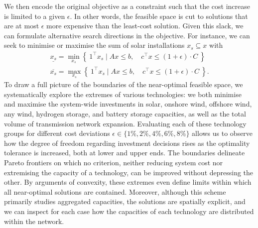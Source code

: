 We then encode the original objective as a constraint such that the cost
increase is limited to a given $\epsilon$. In other words, the feasible space is
cut to solutions that are at most $\epsilon$ more expensive than the least-cost
solution. Given this slack, we can formulate alternative search directions in
the objective. For instance, we can seek to minimise or maximise the sum of
solar installations $x_s \subseteq x$ with
\begin{align}
    \label{eq:xs_max}
    \underline{x_s} = \min_{x_s}\left\{\: 1^\top x_s \mid Ax\leq b,\quad c^\top x\leq (1+\epsilon)\cdot C \:\right\} \\
    \label{eq:xs_min}
    \overline{x_s} = \max_{x_s}\left\{\: 1^\top x_s \mid Ax\leq b,\quad c^\top x\leq (1+\epsilon)\cdot C \:\right\}.
\end{align}
To draw a full picture of the boundaries of the near-optimal feasible space, we
systematically explore the extremes of various technologies: we both minimise
and maximise the system-wide investments in solar, onshore wind, offshore wind,
any wind, hydrogen storage, and battery storage capacities, as well as the total
volume of transmission network expansion. Evaluating each of these technology
groups for different cost deviations $\epsilon \in \{1\%,2\%,4\%,6\%,8\%\}$
allows us to observe how the degree of freedom regarding investment decisions
rises as the optimality tolerance is increased, both at lower and upper ends.
The boundaries delineate Pareto frontiers on which no criterion, neither
reducing system cost nor extremising the capacity of a technology, can be
improved without depressing the other. By arguments of convexity, these extremes
even define limits within which all near-optimal solutions are contained.
Moreover, although this scheme primarily studies aggregated capacities, the
solutions are spatially explicit, and we can inspect for each case how the
capacities of each technology are distributed within the network.


